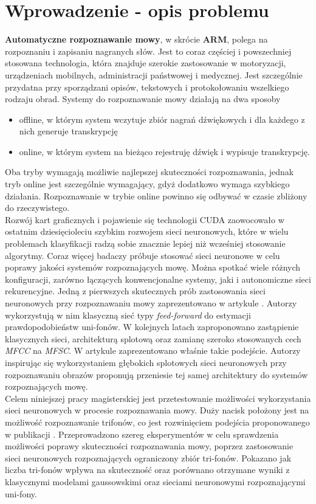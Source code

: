 \documentclass[11pt]{article}
\begin{document}
\section{Wprowadzenie - opis problemu}
	\textbf{Automatyczne rozpoznawanie mowy}, w skrócie \textbf{ARM}, polega na rozpoznaniu i zapisaniu nagranych słów. Jest to coraz częściej i powszechniej stosowana technologia, która znajduje szerokie zastosowanie w motoryzacji, urządzeniach mobilnych, administracji państwowej i medycznej. Jest szczególnie przydatna przy sporządzani opisów, tekstowych i protokołowaniu wszelkiego rodzaju obrad. Systemy do rozpoznawanie mowy działają na dwa sposoby
	\begin{itemize}
		\item offline, w którym system wczytuje zbiór nagrań dźwiękowych i dla każdego z nich generuje transkrypcję
		\item online, w którym system na bieżąco rejestruję dźwięk i wypisuje transkrypcję.
	\end{itemize}
	Oba tryby wymagają możliwie najlepszej skuteczności rozpoznawania, jednak tryb online jest szczególnie wymagający, gdyż dodatkowo wymaga szybkiego działania. Rozpoznawanie w trybie online powinno się odbywać w czasie zbliżony do rzeczywistego. 
	\\
	Rozwój kart graficznych i pojawienie się technologii CUDA zaowocowało w ostatnim dziesięcioleciu szybkim rozwojem sieci neuronowych, które w wielu problemach klasyfikacji radzą sobie znacznie lepiej niż wcześniej stosowanie algorytmy. Coraz więcej badaczy próbuje stosować sieci neuronowe w celu poprawy jakości systemów rozpoznających mowę. Można spotkać wiele różnych konfiguracji, zarówno łączących konwencjonalne systemy, jaki i autonomiczne sieci rekurencyjne.
	Jedną z pierwszych skutecznych prób zastosowania sieci neuronowych przy rozpoznawaniu mowy zaprezentowano w artykule \cite{NN_ASR_monophones}. Autorzy wykorzystują w nim klasyczną sieć typy \textit{feed-forward} do estymacji prawdopodobieństw uni-fonów. W kolejnych latach zaproponowano zastąpienie klasycznych sieci, architekturą splotową oraz zamianę szeroko stosowanych cech \textit{MFCC} na \textit{MFSC}. W artykule \cite{article1} zaprezentowano właśnie takie podejście. Autorzy inspirując się wykorzystaniem głębokich splotowych sieci neuronowych przy rozpoznawaniu obrazów proponują przeniesie tej samej architektury do systemów rozpoznających mowę.
	\\
	Celem niniejszej pracy magisterskiej jest przetestowanie możliwości wykorzystania sieci neuronowych w procesie rozpoznawania mowy. Duży nacisk położony jest na możliwość rozpoznawanie trifonów, co jest rozwinięciem podejścia proponowanego w publikacji \cite{NN_ASR_monophones}. Przeprowadzono szereg eksperymentów w celu sprawdzenia możliwości poprawy skuteczności rozpoznawania mowy, poprzez zastosowanie sieci neuronowych rozpoznających ograniczony zbiór tri-fonów. Pokazano jak liczba tri-fonów wpływa na skuteczność oraz porównano otrzymane wyniki z klasycznymi modelami gaussowskimi oraz sieciami neuronowymi rozpoznającymi uni-fony.
\end{document}
